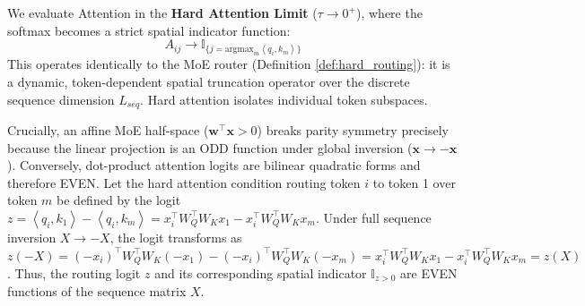 \documentclass{article}
\newcommand{\1}{\mathbb{I}}
\newcommand{\inner}[2]{\left\langle#1, #2\right\rangle}
\newcommand{\bx}{\mathbf{x}}
\newcommand{\bw}{\mathbf{w}}
\begin{document}
We evaluate Attention in the \textbf{Hard Attention Limit} ($\tau \to 0^+$), where the softmax becomes a strict spatial indicator function:
\begin{equation}
    A_{ij} \to \1_{\{j = \text{argmax}_m \inner{q_i}{k_m}\}}
\end{equation}
This operates identically to the MoE router (Definition \ref{def:hard_routing}): it is a dynamic, token-dependent spatial truncation operator over the discrete sequence dimension $L_{seq}$. Hard attention isolates individual token subspaces. 

Crucially, an affine MoE half-space ($\bw^\top \bx > 0$) breaks parity symmetry precisely because the linear projection is an ODD function under global inversion ($\bx \to -\bx$). Conversely, dot-product attention logits are bilinear quadratic forms and therefore EVEN. Let the hard attention condition routing token $i$ to token 1 over token $m$ be defined by the logit $z = \inner{q_i}{k_1} - \inner{q_i}{k_m} = x_i^\top W_Q^\top W_K x_1 - x_i^\top W_Q^\top W_K x_m$. Under full sequence inversion $X \to -X$, the logit transforms as $z(-X) = (-x_i)^\top W_Q^\top W_K (-x_1) - (-x_i)^\top W_Q^\top W_K (-x_m) = x_i^\top W_Q^\top W_K x_1 - x_i^\top W_Q^\top W_K x_m = z(X)$. Thus, the routing logit $z$ and its corresponding spatial indicator $\1_{z > 0}$ are EVEN functions of the sequence matrix $X$. 
\end{document}
